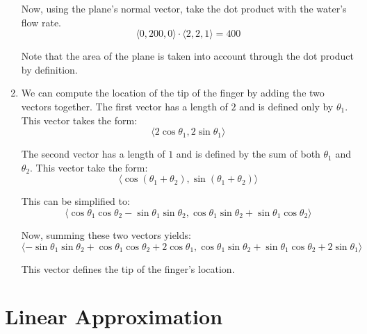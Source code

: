 \documentclass{article}
\begin{document}
\begin{enumerate}[1.]
    Now, using the plane's normal vector, take the dot product with the water's
    flow rate.
    $$ \langle 0, 200, 0 \rangle \cdot \langle 2, 2, 1 \rangle = 400$$

    Note that the area of the plane is taken into account through the dot
    product by definition.

  \item We can compute the location of the tip of the finger by adding the two
    vectors together. The first vector has a length of $2$ and is defined only
    by $\theta_{1}$. This vector takes the form:
    $$ \langle 2 \cos \theta_{1}, 2 \sin \theta_{1} \rangle $$

    The second vector has a length of $1$ and is defined by the sum of both
    $\theta_{1}$ and $\theta_{2}$. This vector take the form:
    $$ \langle \cos(\theta_{1} + \theta_{2}), \sin(\theta_{1} + \theta_{2})
    \rangle $$

    This can be simplified to:
    $$ \langle \cos \theta_{1} \cos \theta_{2} - \sin \theta_{1} \sin
    \theta_{2}, \cos \theta_{1} \sin \theta_{2} + \sin \theta_{1} \cos
    \theta_{2} \rangle $$

    Now, summing these two vectors yields:
    $$ \langle - \sin \theta_{1} \sin \theta_{2} + \cos \theta_{1} \cos \theta_{2} + 2
    \cos \theta_{1}, \cos \theta_{1} \sin \theta_{2} + \sin \theta_{1} \cos
    \theta_{2} + 2 \sin \theta_{1} \rangle $$

    This vector defines the tip of the finger's location.
\end{enumerate}

\section{Linear Approximation}
\end{document}
